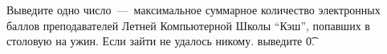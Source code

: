 Выведите одно число~---~максимальное суммарное количество электронных баллов преподавателей Летней Компьютерной Школы ``Кэш'', попавших в столовую на ужин. Если зайти не удалось никому. выведите \t{0}.